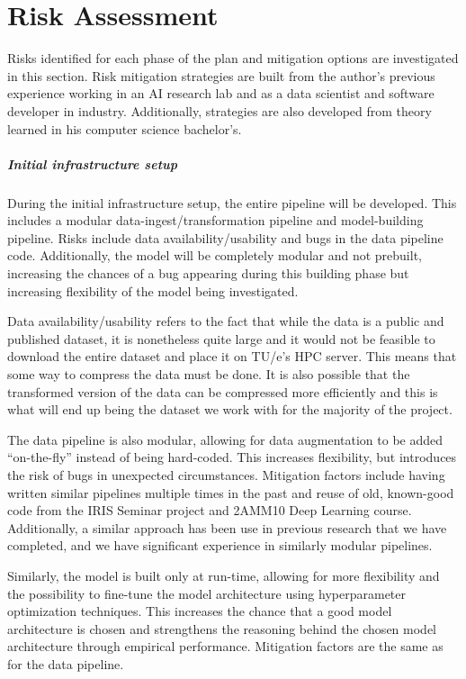 \chapter{Risk Assessment}

Risks identified for each phase of the plan and mitigation options are investigated in this section.
Risk mitigation strategies are built from the author's previous experience working in an AI research lab and as a data scientist and software developer in industry.
Additionally, strategies are also developed from theory learned in his computer science bachelor's.

\paragraph{Initial infrastructure setup}
During the initial infrastructure setup, the entire pipeline will be developed.
This includes a modular data-ingest/transformation pipeline and model-building pipeline.
Risks include data availability/usability and bugs in the data pipeline code.
Additionally, the model will be completely modular and not prebuilt, increasing the chances of a bug appearing during this building phase but increasing flexibility of the model being investigated.

Data availability/usability refers to the fact that while the data is a public and published dataset, it is nonetheless quite large and it would not be feasible to download the entire dataset and place it on TU/e's HPC server. 
This means that some way to compress the data must be done.
It is also possible that the transformed version of the data can be compressed more efficiently and this is what will end up being the dataset we work with for the majority of the project.

The data pipeline is also modular, allowing for data augmentation to be added ``on-the-fly'' instead of being hard-coded.
This increases flexibility, but introduces the risk of bugs in unexpected circumstances.
Mitigation factors include having written similar pipelines multiple times in the past and reuse of old, known-good code from the IRIS Seminar project and 2AMM10 Deep Learning course.
Additionally, a similar approach has been use in previous research that we have completed, and we have significant experience in similarly modular pipelines.

Similarly, the model is built only at run-time, allowing for more flexibility and the possibility to fine-tune the model architecture using hyperparameter optimization techniques.
This increases the chance that a good model architecture is chosen and strengthens the reasoning behind the chosen model architecture through empirical performance.
Mitigation factors are the same as for the data pipeline.

